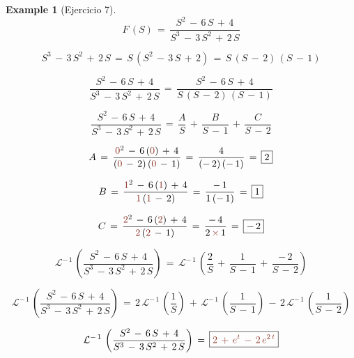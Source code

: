 \documentclass[a4paper,11pt,openany]{book}
\newtheorem{exmp}{Example}[section]
\begin{document}
\begin{exmp}[Ejercicio 7]
 
$$F\,(S)\,=\,\dfrac{S^{2}\,-\,6\,S\,+\,4}{S^{3}\,-\,3\,S^{2}\,+\,2\,S}$$
 
 
\textcolor{burntumber}{} $$S^{3}\,-\,3\,S^{2}\,+\,2\,S\,=\,S\,(S^{2}\,-\,3\,S\,+\,2)\,=\,S\,(S\,-\,2)\,(S\,-\,1)$$ 
 
\textcolor{burntumber}{} $$\dfrac{S^{2}\,-\,6\,S\,+\,4}{S^{3}\,-\,3\,S^{2}\,+\,2\,S}\,=\,\dfrac{S^{2}\,-\,6\,S\,+\,4}{S\,(S\,-\,2)\,(S\,-\,1)}$$
 
\textcolor{burntumber}{} $$\dfrac{S^{2}\,-\,6\,S\,+\,4}{S^{3}\,-\,3\,S^{2}\,+\,2\,S}\,=\,\dfrac{A}{S}\,+\,\dfrac{B}{S\,-\,1}\,+\,\dfrac{C}{S\,-\,2} $$
 
\textcolor{burntumber}{} $$A\,=\,\dfrac{\textcolor{burntumber}{0}^{2}\,-\,6\,(\textcolor{burntumber}{0})\,+\,4}{(\textcolor{burntumber}{0}\,-\,2)\,(\textcolor{burntumber}{0}\,-\,1)}\,=\,\dfrac{4}{(-\,2)\,(-\,1) }\,=\,\boxed{2} $$
 
\textcolor{burntumber}{} $$B\,=\,\dfrac{\textcolor{burntumber}{1}^{2}\,-\,6\,(\textcolor{burntumber}{1})\,+\,4}{\textcolor{burntumber}{1}\,(\textcolor{burntumber}{1}\,-\,2) }\,=\,\dfrac{-\,1}{1\,(-\,1)}\,=\,\boxed{1}$$
 
\textcolor{burntumber}{} $$C\,=\,\dfrac{\textcolor{burntumber}{2}^{2}\,-\,6\,(\textcolor{burntumber}{2})\,+\,4}{\textcolor{burntumber}{2}\,(\textcolor{burntumber}{2}\,-\,1)}\,=\,\dfrac{-\,4}{2\,\textcolor{burntumber}{\times}\,1}\,=\,\boxed{-\,2}$$
 
\textcolor{burntumber}{} $$\mathcal{L}^{-\,1}\,\left(\dfrac{S^{2}\,-\,6\,S\,+\,4}{S^{3}\,-\,3\,S^{2}\,+\,2\,S} \right)\,=\,\mathcal{L}^{-\,1}\,\left(\dfrac{2}{S}\,+\,\dfrac{1}{S\,-\,1}\,+\,\dfrac{-\,2}{S\,-\,2} \right) $$
 
\textcolor{burntumber}{} $$\mathcal{L}^{-\,1}\,\left(\dfrac{S^{2}\,-\,6\,S\,+\,4}{S^{3}\,-\,3\,S^{2}\,+\,2\,S} \right)\,=\,2\,\mathcal{L}^{-\,1}\,\left(\dfrac{1}{S} \right)\,+\,\mathcal{L}^{-\,1}\,\left(\dfrac{1}{S\,-\,1} \right)\,-\,2\,\mathcal{L}^{-\,1}\,\left(\dfrac{1}{S\,-\,2} \right)$$
 
\textcolor{burntumber}{} $$\mathcal{L}^{-\,1}\,\left(\dfrac{S^{2}\,-\,6\,S\,+\,4}{S^{3}\,-\,3\,S^{2}\,+\,2\,S} \right)\,=\,\boxed{\textcolor{burntumber}{2\,+\,e^{t}\,-\,2\,e^{2\,t} } }$$
 
\end{exmp}
\end{document}
